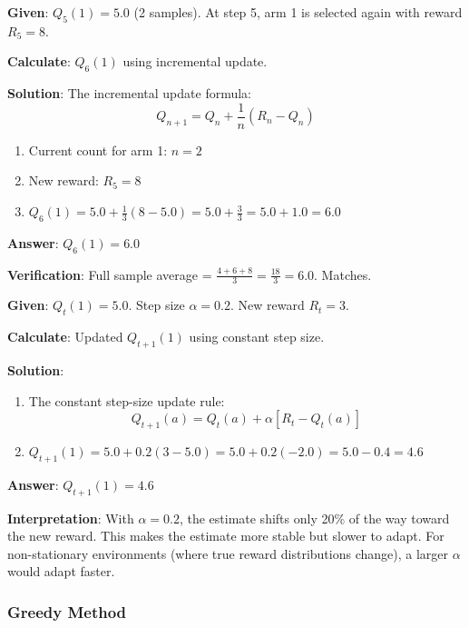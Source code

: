 \documentclass[11pt,a4paper]{article}
\begin{document}
\begin{tcolorbox}[colback=green!5!white,colframe=green!75!black,title=\textbf{Worked Example 2: Incremental Update with Sample Average}]
\textbf{Given}: $Q_5(1) = 5.0$ (2 samples). At step 5, arm 1 is selected again with reward $R_5 = 8$.

\textbf{Calculate}: $Q_6(1)$ using incremental update.

\textbf{Solution}:
The incremental update formula:
\[
Q_{n+1} = Q_n + \frac{1}{n}(R_n - Q_n)
\]

\begin{enumerate}
    \item Current count for arm 1: $n = 2$
    \item New reward: $R_5 = 8$
    \item $Q_6(1) = 5.0 + \frac{1}{3}(8 - 5.0) = 5.0 + \frac{3}{3} = 5.0 + 1.0 = 6.0$
\end{enumerate}

\textbf{Answer}: $Q_6(1) = 6.0$

\textbf{Verification}: Full sample average = $\frac{4 + 6 + 8}{3} = \frac{18}{3} = 6.0$. Matches.
\end{tcolorbox}

\begin{tcolorbox}[colback=green!5!white,colframe=green!75!black,title=\textbf{Worked Example 3: Non-Stationary with Constant Step Size}]
\textbf{Given}: $Q_t(1) = 5.0$. Step size $\alpha = 0.2$. New reward $R_t = 3$.

\textbf{Calculate}: Updated $Q_{t+1}(1)$ using constant step size.

\textbf{Solution}:
\begin{enumerate}
    \item The constant step-size update rule:
    \[
    Q_{t+1}(a) = Q_t(a) + \alpha [R_t - Q_t(a)]
    \]
    \item $Q_{t+1}(1) = 5.0 + 0.2(3 - 5.0) = 5.0 + 0.2(-2.0) = 5.0 - 0.4 = 4.6$
\end{enumerate}

\textbf{Answer}: $Q_{t+1}(1) = 4.6$

\textbf{Interpretation}: With $\alpha = 0.2$, the estimate shifts only 20\% of the way toward the new reward. This makes the estimate more stable but slower to adapt. For non-stationary environments (where true reward distributions change), a larger $\alpha$ would adapt faster.
\end{tcolorbox}

\subsubsection{Greedy Method}
\end{document}
